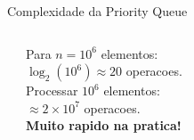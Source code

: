 \documentclass[aspectratio=169,11pt]{beamer}
\begin{document}
\begin{frame}{Complexidade da Priority Queue}
\begin{columns}[c]
\begin{tcolorbox}[caixaAmarelo,title={Comparacao geral}]
\begin{tabular}{lccc}
        \end{tabular}
      \end{tcolorbox}
      \vspace{0.18cm}
      \begin{tcolorbox}[caixaVermelho,title={O(log n) e rapido!}]
        \small
        Para $n = 10^6$ elementos:\\
        $\log_2(10^6) \approx 20$ operacoes.\\[4pt]
        Processar $10^6$ elementos:\\
        $\approx 2 \times 10^7$ operacoes.\\
        \textbf{Muito rapido na pratica!}
      \end{tcolorbox}
  \end{columns}
\end{frame}
\end{document}
